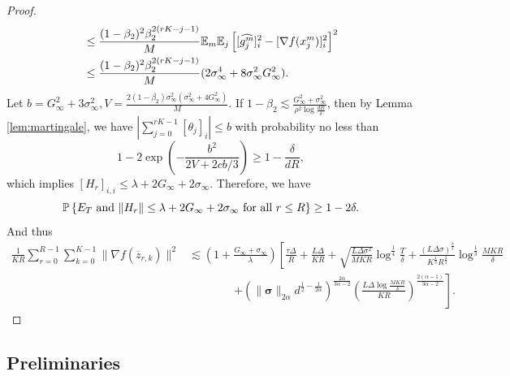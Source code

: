 \documentclass{article} %
\numberwithin{equation}{section}
\begin{document}
\begin{proof}
\begin{equation}
\begin{aligned}
            &\leq \frac{(1-\beta_2)^2\beta_2^{2(rK-j-1)}}{M}\mathbb{E}_m\mathbb{E}_j \left[[\widehat{g_j^m}]_i^2 - [\nabla f(x_j^m)]_i^2\right]^2 \\
            &\leq \frac{(1-\beta_2)^2\beta_2^{2(rK-j-1)}}{M}(2\sigma_\infty^4 + 8\sigma_\infty^2G_\infty^2).
        \end{aligned}
    \end{equation}
    Let $b=G_\infty^2+3\sigma_\infty^2, V=\frac{2(1-\beta_2)\sigma_\infty^2(\sigma_\infty^2+4G_\infty^2)}{M}$.
    If $1-\beta_2\lesssim \frac{G_\infty^2+\sigma_\infty^2}{\rho^2\log\frac{dR}{\delta}}$, then by Lemma \ref{lem:martingale}, we have $|\sum_{j=0}^{rK-1}[\theta_j]_i|\leq b$ with probability no less than 
    \begin{equation}
        1 - 2\exp{\left( -\frac{b^2}{2V+2cb/3}\right)} \geq 1-\frac{\delta}{dR},
    \end{equation}
    which implies $[H_r]_{i,i}\leq \lambda+2G_\infty+2\sigma_\infty$.
    Therefore, we have
    \begin{equation}
        \mathbb{P}\left\{E_T \text{ and } \|H_r\|\leq \lambda+2G_\infty+2\sigma_\infty \text{ for all }r\leq R \right\} \geq 1-2\delta.
    \end{equation}
    And thus
    \begin{equation}
        \begin{aligned}
            \frac{1}{KR}\sum_{r=0}^{R-1}\sum_{k=0}^{K-1}\|\nabla f(\overline{z}_{r,k}) \|^2 
            &\lesssim \left(1+\frac{G_\infty+\sigma_\infty}{\lambda}\right)\left[\frac{\tau\Delta}{R} + \frac{L\Delta}{KR} + \sqrt{\frac{L\Delta\sigma^2}{MKR}}\log^{\frac{1}{4}}\frac{T}{\delta} + \frac{(L\Delta\sigma)^{\frac{2}{3}}}{K^{\frac{1}{3}}R^{\frac{2}{3}}}\log^{\frac{1}{3}}\frac{MKR}{\delta} \right. \\
            &\qquad\qquad \left.+ \left(\|\boldsymbol{\sigma}\|_{2\alpha}d^{\frac{1}{2}-\frac{1}{2\alpha}}\right)^{\frac{2\alpha}{3\alpha-2}}\left(\frac{L\Delta\log\frac{MKR}{\delta}}{KR}\right)^{\frac{2(\alpha-1)}{3\alpha-2}}\right].
        \end{aligned}
    \end{equation}
\end{proof}



\subsection{Preliminaries}
\end{document}
